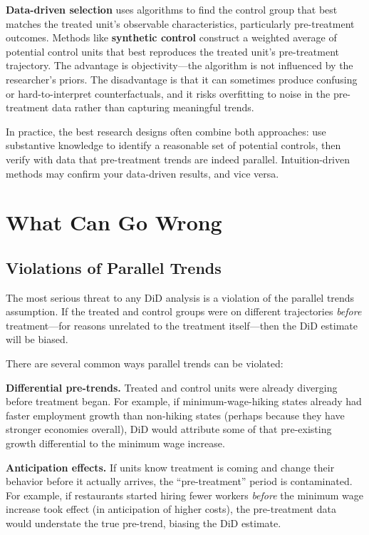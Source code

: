 \documentclass[
  letterpaper,
  DIV=11,
  numbers=noendperiod]{scrreprt}
\begin{document}
\textbf{Data-driven selection} uses algorithms to find the control group
that best matches the treated unit's observable characteristics,
particularly pre-treatment outcomes. Methods like \textbf{synthetic
control} construct a weighted average of potential control units that
best reproduces the treated unit's pre-treatment trajectory. The
advantage is objectivity---the algorithm is not influenced by the
researcher's priors. The disadvantage is that it can sometimes produce
confusing or hard-to-interpret counterfactuals, and it risks overfitting
to noise in the pre-treatment data rather than capturing meaningful
trends.

In practice, the best research designs often combine both approaches:
use substantive knowledge to identify a reasonable set of potential
controls, then verify with data that pre-treatment trends are indeed
parallel. Intuition-driven methods may confirm your data-driven results,
and vice versa.

\section{What Can Go Wrong}\label{what-can-go-wrong}

\subsection{Violations of Parallel
Trends}\label{violations-of-parallel-trends}

The most serious threat to any DiD analysis is a violation of the
parallel trends assumption. If the treated and control groups were on
different trajectories \emph{before} treatment---for reasons unrelated
to the treatment itself---then the DiD estimate will be biased.

There are several common ways parallel trends can be violated:

\textbf{Differential pre-trends.} Treated and control units were already
diverging before treatment began. For example, if minimum-wage-hiking
states already had faster employment growth than non-hiking states
(perhaps because they have stronger economies overall), DiD would
attribute some of that pre-existing growth differential to the minimum
wage increase.

\textbf{Anticipation effects.} If units know treatment is coming and
change their behavior before it actually arrives, the ``pre-treatment''
period is contaminated. For example, if restaurants started hiring fewer
workers \emph{before} the minimum wage increase took effect (in
anticipation of higher costs), the pre-treatment data would understate
the true pre-trend, biasing the DiD estimate.
\end{document}
